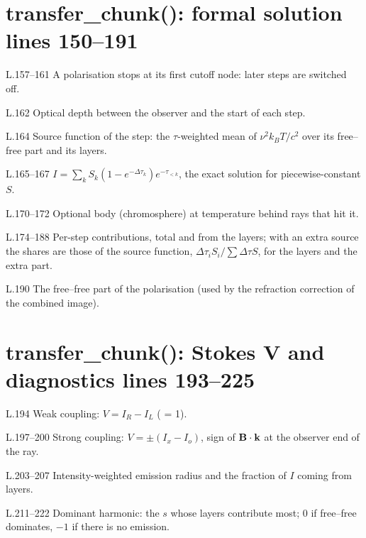 \section*{\normalsize transfer\_chunk(): formal solution \hfill{\small\mdseries\color{gray}lines 150--191}}

\begin{lines}
\item[L.157–161] A polarisation stops at its first cutoff node: later steps are switched off.
\item[L.162] Optical depth between the observer and the start of each step.
\item[L.164] Source function of the step: the $\tau$-weighted mean of $\nu^2k_BT/c^2$ over its free--free part and its layers.
\item[L.165–167] $I=\sum_k S_k(1-e^{-\Delta\tau_k})e^{-\tau_{<k}}$, the exact solution for piecewise-constant $S$.
\item[L.170–172] Optional body (chromosphere) at temperature  behind rays that hit it.
\item[L.174–188] Per-step contributions, total and from the layers; with an extra source the shares are those of the source function, $\Delta\tau_iS_i/\sum\Delta\tau S$, for the layers and the extra part.
\item[L.190] The free--free part of the polarisation (used by the refraction correction of the combined image).
\end{lines}
\section*{\normalsize transfer\_chunk(): Stokes V and diagnostics \hfill{\small\mdseries\color{gray}lines 193--225}}

\begin{lines}
\item[L.194] Weak coupling: $V=I_R-I_L$ ( = 1).
\item[L.197–200] Strong coupling: $V=\pm(I_x-I_o)$, sign of $\mathbf{B}\cdot\mathbf{k}$ at the observer end of the ray.
\item[L.203–207] Intensity-weighted emission radius and the fraction of $I$ coming from layers.
\item[L.211–222] Dominant harmonic: the $s$ whose layers contribute most; 0 if free--free dominates, $-1$ if there is no emission.
\end{lines}

